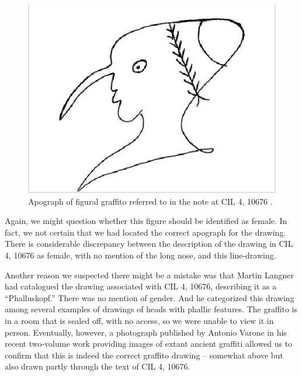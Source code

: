 \documentclass[amsthm,ebook]{saparticle}
\begin{document}
\begin{figure}[!bp]
\centering
 \includegraphics[width=\columnwidth]{EAGLE2016BenefielSypniewski-img007.jpg}
\caption{Apograph of figural graffito referred to in the note at CIL 4, 10676 \citet[n. 309]{langner_antike_2001}.}
\label{fig:7}
\end{figure}


Again, we might question whether this figure should be identified as female. In fact, we not certain that we had located
the correct apograph for the drawing. There is considerable discrepancy between the description of the drawing in CIL
4, 10676 as female, with no mention of the long nose, and this line-drawing. 

Another reason we suspected there might be a mistake was that Martin Langner had catalogued the drawing associated with
CIL 4, 10676, describing it as a ``Phalluskopf.'' There was no mention of gender. And he categorized this drawing among
several examples of drawings of heads with phallic features. The graffito is in a room that is sealed off, with no
access, so we were unable to view it in person. Eventually, however, a photograph published by Antonio Varone in his
recent two-volume work providing images of extant ancient graffiti \citep[509]{varone_titulorum_2012} allowed us to confirm that this
is indeed the correct graffito drawing – somewhat above but also drawn partly through the text of CIL 4, 10676. 
\end{document}
